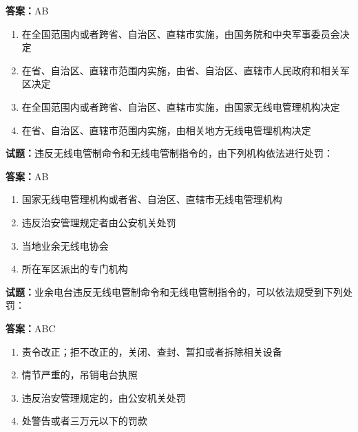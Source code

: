 \documentclass{ctexbook}
\begin{document}
\textbf{答案：}AB 

\begin{enumerate}[leftmargin=3em]
  \item 在全国范围内或者跨省、自治区、直辖市实施，由国务院和中央军事委员会决定 

  \item 在省、自治区、直辖市范围内实施，由省、自治区、直辖市人民政府和相关军区决定 

  \item 在全国范围内或者跨省、自治区、直辖市实施，由国家无线电管理机构决定 

  \item 在省、自治区、直辖市范围内实施，由相关地方无线电管理机构决定 

\end{enumerate}





\vspace{1em}

\textbf{试题：}违反无线电管制命令和无线电管制指令的，由下列机构依法进行处罚： 

\textbf{答案：}AB 

\begin{enumerate}[leftmargin=3em]
  \item 国家无线电管理机构或者省、自治区、直辖市无线电管理机构 

  \item 违反治安管理规定者由公安机关处罚 

  \item 当地业余无线电协会 

  \item 所在军区派出的专门机构 

\end{enumerate}





\vspace{1em}

\textbf{试题：}业余电台违反无线电管制命令和无线电管制指令的，可以依法规受到下列处罚： 

\textbf{答案：}ABC 

\begin{enumerate}[leftmargin=3em]
  \item 责令改正；拒不改正的，关闭、查封、暂扣或者拆除相关设备 

  \item 情节严重的，吊销电台执照 

  \item 违反治安管理规定的，由公安机关处罚 

  \item 处警告或者三万元以下的罚款 

\end{enumerate}
\end{document}
